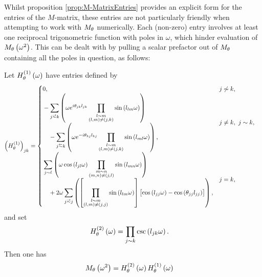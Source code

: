 Whilst proposition \ref{prop:M-MatrixEntries} provides an explicit form for the entries of the $M$-matrix, these entries are not particularly friendly when attempting to work with $M_\theta$ numerically.
Each (non-zero) entry involves at least one reciprocal trigonometric function with poles in $\omega$, which hinder evaluation of $M_\theta\left( \omega^2 \right)$.
This can be dealt with by pulling a scalar prefactor out of $M_\theta$ containing all the poles in question, as follows:
\begin{cory} \label{cory:M-MatrixEntriesNoPoles}
	Let $H^{(1)}_\theta\left( \omega \right)$ have entries defined by
	\begin{align*}
		\bracs{H^{(1)}_\qm}_{jk} &= 
		\begin{cases}
			\!\begin{aligned}
				&0,
			\end{aligned}			
			& j \not\con k, \\
			\!\begin{aligned}
				&-\sum_{j\conLeft k} \bracs{ \omega e^{i\qm_{jk}l_{jk}} \prod_{\substack{ l\con m \\ \bracs{l,m} \neq \bracs{j,k} }}\sin\bracs{l_{lm}\omega} }
				\\ &\quad - \sum_{j\conRight k} \bracs{ \omega e^{-i\qm_{kj}l_{kj}} \prod_{\substack{l\con m \\ \bracs{l,m} \neq \bracs{j,k} }}\sin\bracs{l_{ml}\omega} },
			\end{aligned}
			& j\neq k, \ j\con k, \\
			\!\begin{aligned}
				&\sum_{j\con l} \bracs{ \omega\cos\bracs{l_{jl}\omega}\prod_{\substack{ m\con n \\ \bracs{m,n}\neq\bracs{j,l} }}\sin\bracs{l_{mn}\omega} }
				\\ &\quad + 2\omega\sum_{j\conLeft j} \bracs{ \sqbracs{ \prod_{\substack{l\con m \\ \bracs{l,m}\neq\bracs{j,j} }}\sin\bracs{l_{lm}\omega} }\bigl[ \cos\bracs{l_{jj}\omega} - \cos\bracs{\qm_{jj}l_{jj}} \bigr] },
			\end{aligned}
			& j=k,
		\end{cases}
	\end{align*}
	and set
	\begin{align*}
		H^{(2)}_\theta\left( \omega \right) &= \prod_{j\sim k}\csc\left( l_{jk}\omega \right).
	\end{align*}
	Then one has
	\begin{align*}
		M_\theta\left( \omega^2 \right) &= H^{(2)}_\theta\left( \omega \right)H^{(1)}_\theta\left( \omega \right)
	\end{align*}
\end{cory}
